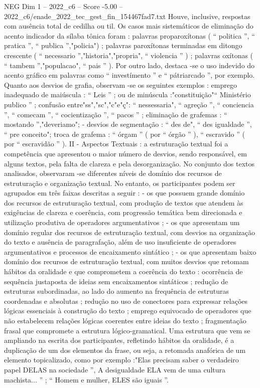 \begin{textsample}{NEG Dim 1 – 2022\_c6 – Score -5.00 – 2022\_c6/enade\_2022\_tec\_gest\_fin\_154467fad7.txt}
Houve, inclusive, respostas com ausência total de cedilha ou til.
Os casos mais sistemáticos de eliminação do acento indicador da sílaba tônica foram : palavras proparoxítonas ( “ politica ”, “ pratica ”, “ publica ”,"policia") ; palavras paroxítonas terminadas em ditongo crescente ( “ necessario ”,"historia","propria", “ violencia ” ) ; palavras oxítonas ( “ tambem ”,"populacao", “ pais ” ).
Por outro lado, destaca -se o uso indevido do acento gráfico em palavras como “ investímento ” e “ pátriarcado ”, por exemplo.
Quanto aos desvios de grafia, observam -se os seguintes exemplos : emprego inadequado de maiúscula : “ Leis ” ; ou de minúscula :"constituição"“ Ministério publico ” ; confusão entre"ss","sc","c"e"ç": “ nessessaria", “ agreção ”, “ conciencia ”, “ comecam ”, “ cocientização ”, “ pacos ” ; eliminação de grafemas : “ mostando ”,"deveriamo"; - desvios de segmentação : “ des de", “ des igualdade ”, “ pre conceito"; troca de grafema : “ órgam ” ( por “ órgão ” ), “ escravido ” ( por “ escravidão ” ).
II - Aspectos Textuais : a estruturação textual foi a competência que apresentou o maior número de desvios, sendo responsável, em alguns textos, pela falta de clareza e pela desorganização.
No conjunto dos textos analisados, observaram -se diferentes níveis de domínio dos recursos de estruturação e organização textual.
No entanto, os participantes podem ser agrupados em três faixas descritas a seguir : - os que possuem grande domínio dos recursos de estruturação textual, com produção de textos que atendem às exigências de clareza e coerência, com progressão temática bem direcionada e utilização produtiva de operadores argumentativos ; - os que apresentam um domínio regular dos recursos de estruturação textual, com desvios na organização do texto e ausência de paragrafação, além de uso insuficiente de operadores argumentativos e processos de encaixamento sintático ; - os que apresentam baixo domínio dos recursos de estruturação textual, com muitos desvios que retomam hábitos da oralidade e que comprometem a coerência do texto : ocorrência de sequência justaposta de ideias sem encaixamentos sintáticos ; redução de estruturas subordinadas, ao lado do aumento na frequência de estruturas coordenadas e absolutas ; redução no uso de conectores para expressar relações lógicas essenciais à construção do texto ; emprego equivocado de operadores que não estabelecem relações lógicas coerentes entre ideias do texto ; fragmentação frasal que compromete a estrutura lógico-gramatical.
Uma estrutura que vem se ampliando na escrita dos participantes, refletindo hábitos da oralidade, é a duplicação de um dos elementos da frase, ou seja, a retomada anafórica de um elemento topicalizado, como por exemplo :"Elas precisam saber o verdadeiro papel DELAS na sociedade ”, A desigualdade ELA vem de uma cultura machista... ” ; “ Homem e mulher, ELES são iguais ”.

\end{textsample}
